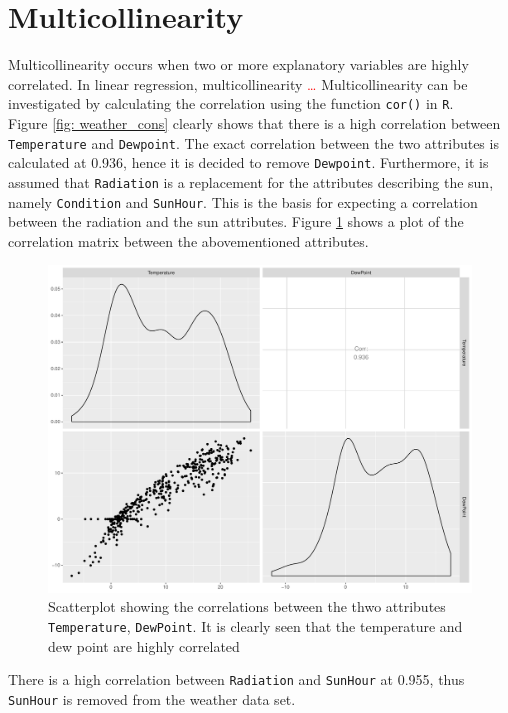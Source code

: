 \section{Multicollinearity}
Multicollinearity occurs when two or more explanatory variables are highly correlated. In linear regression, multicollinearity \textcolor{red}{\dots} Multicollinearity can be investigated by calculating the correlation using the function \texttt{cor()} in \texttt{R}.\\

\noindent Figure \ref{fig: weather_cons} clearly shows that there is a high correlation between \texttt{Temperature} and \texttt{Dewpoint}. The exact correlation between the two attributes is calculated at 0.936, hence it is decided to remove \texttt{Dewpoint}. Furthermore, it is assumed that \texttt{Radiation} is a replacement for the attributes describing the sun, namely \texttt{Condition} and \texttt{SunHour}. This is the basis for expecting a correlation between the radiation and the sun attributes. Figure \ref{fig: gg_cor} shows a plot of the correlation matrix between the abovementioned attributes.
\begin{figure}
    \centering
    \includegraphics[width=1.\textwidth]{../../../figures/gg_cor.pdf}
    \caption{Scatterplot showing the correlations between the thwo attributes \texttt{Temperature}, \texttt{DewPoint}. It is clearly seen that the temperature and dew point are highly correlated}
    \label{fig: gg_cor}
\end{figure}
\noindent There is a high correlation between \texttt{Radiation} and \texttt{SunHour} at 0.955, thus \texttt{SunHour} is removed from the weather data set. \\
 
